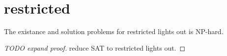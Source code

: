 \section{restricted}
\begin{theorem}
    The existance and solution problems for restricted lights out is NP-hard. 
\end{theorem}

\begin{proof}[TODO expand proof]
    reduce SAT to restricted lights out.
\end{proof}